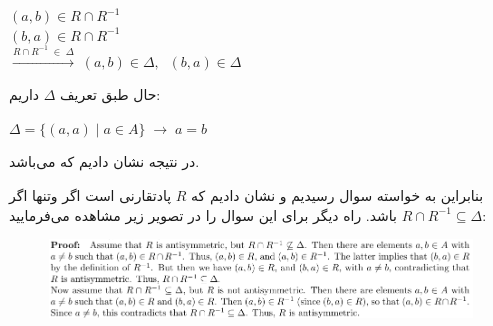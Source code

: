 \begin{enumerate}
\begin{enumerate}
    \begin{center}
        $(a,b)\in R \cap R^{-1}$\\[0.05in]
        $(b,a)\in R \cap R^{-1}$\\[0.05in]
        $\xrightarrow{R \cap R^{-1}\; \in \; \Delta}\;
        (a,b)\in \Delta, \;\; (b,a)\in \Delta$\\[0.08in]
    \end{center}
    حال طبق تعریف $\Delta$ داریم:\\[0.05in]
    \begin{center}
        $\Delta = \{(a, a)\; | \; a \in A \}\; \rightarrow\;
        a=b$\\[0.1in]
    \end{center}
    در نتیجه نشان دادیم که  می‌باشد.
    \end{enumerate}
    بنابراین به خواسته سوال رسیدیم و نشان دادیم که $R$ پادتقارنی است اگر وتنها اگر
    $R \cap R^{-1} \subseteq \Delta$ باشد.
    راه دیگر برای این سوال را در تصویر زیر مشاهده می‌فرمایید:
    \begin{figure} [H]
    \centering
    \includegraphics[scale=0.82]{solution/3.png}
\end{figure}
\end{enumerate}